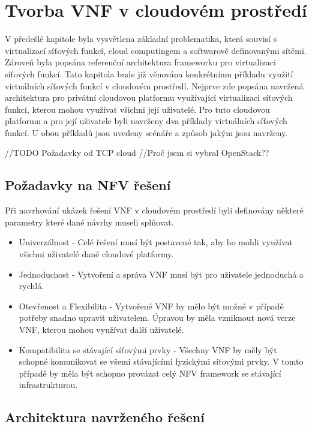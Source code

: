 \chapter{Tvorba VNF v cloudovém prostředí}

V předešlé kapitole byla vysvětlena základní problematika, která souvisí s virtualizací síťových funkcí, cloud computingem a softwarově definovanými sítěmi. Zároveň byla popsána referenční architektura frameworku pro virtualizaci síťových funkcí. Tato kapitola bude již věnována konkrétnímu příkladu využití virtuálních síťových funkcí v cloudovém prostředí. Nejprve zde popsána navržená architektura pro privátní cloudovou platformu využívající virtualizaci síťových funkcí, kterou mohou využívat všichni její uživatelé. Pro tuto cloudovou platformu a pro její uživatele byli navrženy dva příklady virtuálních síťových funkcí. U obou příkladů jsou uvedeny scénáře a způsob jakým jsou navrženy.


//TODO Požadavky od TCP cloud 
//Proč jsem si vybral OpenStack??



\section{Požadavky na NFV řešení}

Při navrhování ukázek řešení VNF v cloudovém prostředí byli definovány některé parametry které dané návrhy museli splňovat.

\begin{itemize}
\item Univerzálnost - Celé řešení musí být postavené tak, aby ho mohli využívat všichni uživatelé dané cloudové platformy. 
\item Jednoduchost - Vytvoření a správa VNF musí být pro uživatele jednoduchá a rychlá.
\item Otevřenost a Flexibilita - Vytvořené VNF by mělo být možné v případě potřeby snadno upravit uživatelem. Úpravou by měla vzniknout nová verze VNF, kterou mohou využívat další uživatelé.  
\item Kompatibilita se stávající síťovými prvky - Všechny VNF by měly být schopné komunikovat se všemi stávajícími fyzickými síťovými prvky. V tomto případě by měla být schopno provázat celý NFV framework se stávající infrastrukturou.
\end{itemize}

\section{Architektura navrženého řešení}

